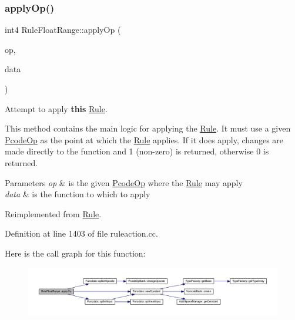 \subsubsection{\texorpdfstring{applyOp()}{applyOp()}}
{\footnotesize\ttfamily int4 Rule\+Float\+Range\+::apply\+Op (\begin{DoxyParamCaption}\item[{\mbox{\hyperlink{class_pcode_op}{Pcode\+Op}} $\ast$}]{op,  }\item[{\mbox{\hyperlink{class_funcdata}{Funcdata}} \&}]{data }\end{DoxyParamCaption})\hspace{0.3cm}{\ttfamily [virtual]}}



Attempt to apply {\bfseries{this}} \mbox{\hyperlink{class_rule}{Rule}}. 

This method contains the main logic for applying the \mbox{\hyperlink{class_rule}{Rule}}. It must use a given \mbox{\hyperlink{class_pcode_op}{Pcode\+Op}} as the point at which the \mbox{\hyperlink{class_rule}{Rule}} applies. If it does apply, changes are made directly to the function and 1 (non-\/zero) is returned, otherwise 0 is returned. 
\begin{DoxyParams}{Parameters}
{\em op} & is the given \mbox{\hyperlink{class_pcode_op}{Pcode\+Op}} where the \mbox{\hyperlink{class_rule}{Rule}} may apply \\
\hline
{\em data} & is the function to which to apply \\
\hline
\end{DoxyParams}


Reimplemented from \mbox{\hyperlink{class_rule_a4e3e61f066670175009f60fb9dc60848}{Rule}}.



Definition at line 1403 of file ruleaction.\+cc.

Here is the call graph for this function\+:
\nopagebreak
\begin{figure}[H]
\begin{center}
\leavevmode
\includegraphics[width=350pt]{class_rule_float_range_a39c5067872e30f4d32dc229c53504cef_cgraph}
\end{center}
\end{figure}
\mbox{\label{class_rule_float_range_a31ef31a3d85c60fbf0a3e64e48e2f0bd}} 
